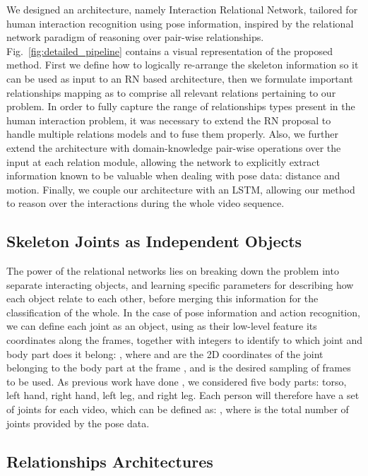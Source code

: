 \documentclass[journal,twoside]{IEEEtran}
\begin{document}
We designed an architecture, namely Interaction Relational Network, tailored for human interaction recognition using pose information, inspired by the relational network paradigm of reasoning over pair-wise relationships.
Fig.~\ref{fig:detailed_pipeline} contains a visual representation of the proposed method.
First we define how to logically re-arrange the skeleton information so it can be used as input to an RN based architecture, then we formulate important relationships mapping as to comprise all relevant relations pertaining to our problem.
In order to fully capture the range of relationships types present in the human interaction problem, it was necessary to extend the RN proposal to handle multiple relations models and to fuse them properly.
Also, we further extend the architecture with domain-knowledge pair-wise operations over the input at each relation module, allowing the network to explicitly extract information known to be valuable when dealing with pose data: distance and motion.
Finally, we couple our architecture with an LSTM, allowing our method to reason over the interactions during the whole video sequence.

\subsection{Skeleton Joints as Independent Objects}


The power of the relational networks lies on breaking down the problem into separate interacting objects, and learning specific parameters for describing how each object relate to each other, before merging this information for the classification of the whole.
In the case of pose information and action recognition, we can define each joint  as an object, using as their low-level feature its coordinates along the frames, together with integers to identify to which joint and body part does it belong: , where  and  are the 2D coordinates of the joint  belonging to the body part  at the frame , and  is the desired sampling of frames to be used.
As previous work have done \cite{Du2015,Shahroudy2016,Liu2018}, we considered five body parts: torso, left hand, right hand, left leg, and right leg.
Each person  will therefore have a set of joints for each video, which can be defined as: , where  is the total number of joints provided by the pose data.

\subsection{Relationships Architectures}
\end{document}
